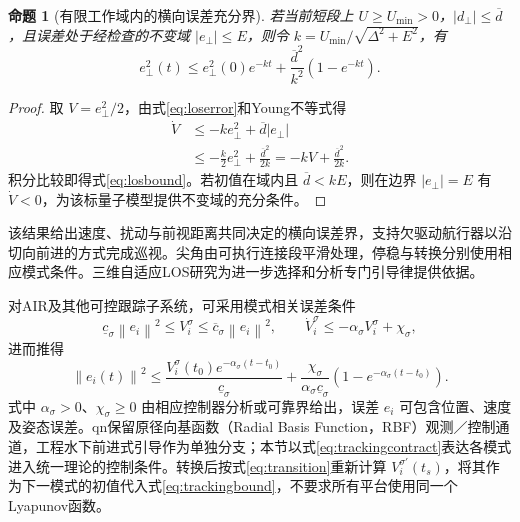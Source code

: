 \documentclass[UTF8,fontset=fandol,a4paper,11pt]{ctexart}
\newtheorem{proposition}{命题}
\newcommand{\norm}[1]{\left\lVert #1\right\rVert}
\begin{document}
\begin{proposition}[有限工作域内的横向误差充分界]
若当前短段上 $U\geq U_{\min}>0$，$|d_\perp|\leq\overline d$，且误差处于经检查的不变域 $|e_\perp|\leq E$，则令 $k=U_{\min}/\sqrt{\Delta^2+E^2}$，有
\begin{equation}
 e_\perp^2(t)\leq e_\perp^2(0)e^{-kt}
       +\frac{\overline d^2}{k^2}(1-e^{-kt}).
 \label{eq:losbound}
\end{equation}
\end{proposition}
\begin{proof}
取 $V=e_\perp^2/2$，由式\eqref{eq:loserror}和Young不等式得
\begin{align}
 \dot V&\leq -ke_\perp^2+\overline d|e_\perp|\\
       &\leq -\frac{k}{2}e_\perp^2+
                 \frac{\overline d^2}{2k}
        =-kV+\frac{\overline d^2}{2k}.
 \label{eq:loslyapunov}
\end{align}
积分比较即得式\eqref{eq:losbound}。若初值在域内且 $\overline d<kE$，则在边界 $|e_\perp|=E$ 有 $\dot V<0$，为该标量子模型提供不变域的充分条件。
\end{proof}

该结果给出速度、扰动与前视距离共同决定的横向误差界，支持欠驱动航行器以沿切向前进的方式完成巡视。尖角由可执行连接段平滑处理，停稳与转换分别使用相应模式条件。三维自适应LOS研究\cite{alos2024}为进一步选择和分析专门引导律提供依据。

对AIR及其他可控跟踪子系统，可采用模式相关误差条件
\begin{equation}
 \underline c_\sigma\norm{e_i}^2\leq V_i^\sigma
 \leq\overline c_\sigma\norm{e_i}^2,
 \qquad \dot V_i^\sigma\leq-\alpha_\sigma V_i^\sigma+\chi_\sigma,
 \label{eq:trackingcontract}
\end{equation}
进而推得
\begin{equation}
 \norm{e_i(t)}^2\leq
 \frac{V_i^\sigma(t_0)e^{-\alpha_\sigma(t-t_0)}}{\underline c_\sigma}
 +\frac{\chi_\sigma}{\alpha_\sigma\underline c_\sigma}
       (1-e^{-\alpha_\sigma(t-t_0)}).
 \label{eq:trackingbound}
\end{equation}
式中 $\alpha_\sigma>0$、$\chi_\sigma\geq0$ 由相应控制器分析或可靠界给出，误差 $e_i$ 可包含位置、速度及姿态误差。qn保留原径向基函数（Radial Basis Function，RBF）观测／控制通道，工程水下前进式引导作为单独分支；本节以式\eqref{eq:trackingcontract}表达各模式进入统一理论的控制条件。转换后按式\eqref{eq:transition}重新计算 $V_i^{\sigma'}(t_s)$，将其作为下一模式的初值代入式\eqref{eq:trackingbound}，不要求所有平台使用同一个Lyapunov函数。
\end{document}
